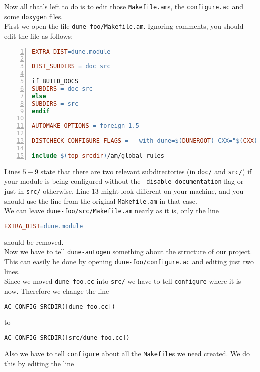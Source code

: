 \documentclass[11pt,a4paper,headinclude,footinclude,DIV16,normalheadings]{scrartcl}
\newcommand{\autogen}{\texttt{dune-autogen}\xspace}
\newcommand{\configure}{\texttt{configure}\xspace}
\newcommand{\configureac}{\texttt{configure.ac}\xspace}
\newcommand{\makefile}{\texttt{Makefile}\xspace}
\newcommand{\makefileam}{\texttt{Makefile.am}\xspace}
\begin{document}
Now all that's left to do is to edit those \texttt{Makefile.am}s, the
\configureac and some \texttt{doxygen} files.\\
First we open the file \texttt{dune-foo/Makefile.am}. Ignoring
comments, you should edit the file as follows:

\begin{lstlisting}[numbers=left,numberstyle=\tiny,numbersep=5pt,language=make]
EXTRA_DIST=dune.module

DIST_SUBDIRS = doc src

if BUILD_DOCS
SUBDIRS = doc src
else
SUBDIRS = src
endif

AUTOMAKE_OPTIONS = foreign 1.5

DISTCHECK_CONFIGURE_FLAGS = --with-dune=$(DUNEROOT) CXX="$(CXX)" CC="$(CC)"

include $(top_srcdir)/am/global-rules
\end{lstlisting}
Lines $5-9$ state that there are two relevant subdirectories
(in \texttt{doc/} and \texttt{src/}) if your module is being
configured without the \texttt{--disable-documentation} flag or just in
\texttt{src/} otherwise. Line 13 might look different on your
machine, and you should use the line from the original \makefileam in that
case.\\
We can leave \texttt{dune-foo/src/Makefile.am} nearly as it is, only the line 

\begin{lstlisting}[language=make]
EXTRA_DIST=dune.module
\end{lstlisting}
should be removed.\\

Now we have to tell \autogen something about the structure of
our project. This can easily be done by opening \texttt{dune-foo/configure.ac}
and editing just two lines.\\
Since we moved \texttt{dune\_foo.cc} into \texttt{src/} we have to tell
\configure where it is now. Therefore we change the line

\begin{lstlisting}[language=make]
AC_CONFIG_SRCDIR([dune_foo.cc])
\end{lstlisting}
to 

\begin{lstlisting}[language=make]
AC_CONFIG_SRCDIR([src/dune_foo.cc])
\end{lstlisting}

Also we have to tell \configure about all the \makefile{}s we need created.
We do this by editing the line
\end{document}

